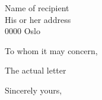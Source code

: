 \documentclass[UKenglish,iss]{xeuioletter}
\begin{document}
\begin{letter}{Name of recipient\\ His or her address\\ 0000 Oslo}
\opening{To whom it may concern,}

The actual letter

\closing{Sincerely yours,}

\end{letter}
\end{document}
